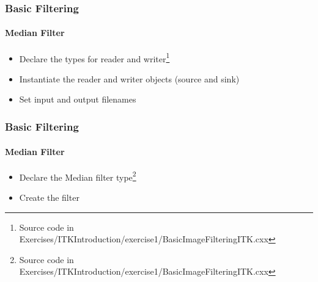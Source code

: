 {
\begin{frame}[fragile]
\frametitle{Basic Filtering}
\framesubtitle{Median Filter}
\begin{itemize}
\item Declare the types for reader and writer\footnote{Source code in Exercises/ITKIntroduction/exercise1/BasicImageFilteringITK.cxx}
\end{itemize}
\begin{center}
\end{center}
\pause
\begin{itemize}
\item Instantiate the reader and writer objects (source and sink)
\end{itemize}
\begin{center}
\end{center}
\pause
\begin{itemize}
\item Set input and output filenames
\end{itemize}
\begin{center}
\end{center}
\end{frame}
}

{
\begin{frame}[fragile]
\frametitle{Basic Filtering}
\framesubtitle{Median Filter}
\begin{itemize}
\item Declare the Median filter type\footnote{Source code in Exercises/ITKIntroduction/exercise1/BasicImageFilteringITK.cxx}
\end{itemize}
\begin{center}
\end{center}
\pause
\begin{itemize}
\item Create the filter
\end{itemize}
\begin{center}
\end{center}
\end{frame}
}

